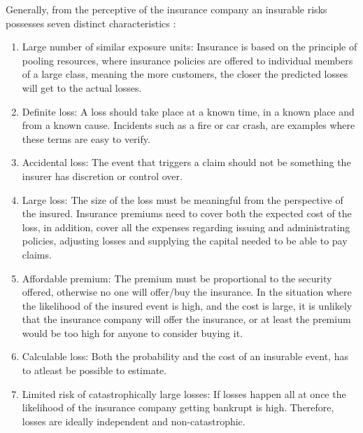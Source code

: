 Generally, from the perceptive of the insurance company an insurable risks possesses seven distinct characteristics \cite{mehr1980principles}: 
   \begin{enumerate}
   \item Large number of similar exposure units: Insurance is based on the principle of pooling resources, where insurance policies are offered to individual members of a large class, meaning the more customers, the closer the predicted losses will get to the actual losses.
   \item Definite loss: A loss should take place at a known time, in a known place and from a known
    cause. Incidents such as a fire or car crash, are examples where these terms are easy to verify.
   \item Accidental loss: The event that triggers a claim should not be 
   something the insurer has discretion or control over.
   \item Large loss: The size of the loss must be meaningful from the perspective of the insured.
    Insurance premiums need to cover both the expected cost of the loss, in addition, 
    cover all the expenses regarding issuing and administrating policies, adjusting losses and
     supplying the capital needed to be able to pay claims.
   \item Affordable premium: The premium must be proportional to the security offered, otherwise no
    one will offer/buy the insurance. In the situation where the likelihood of the insured event is
     high, and the cost is large, it is unlikely that the insurance company will offer the insurance,
      or at least the premium would be too high for anyone to consider buying it. 
   \item Calculable loss: Both the probability and the cost of an insurable event,
    has to atleast be possible to estimate. 
   \item Limited risk of catastrophically large losses: If losses happen all at once the likelihood of
    the insurance company getting bankrupt is high. Therefore, losses are ideally independent and non-catastrophic. 
   \end{enumerate}
   
